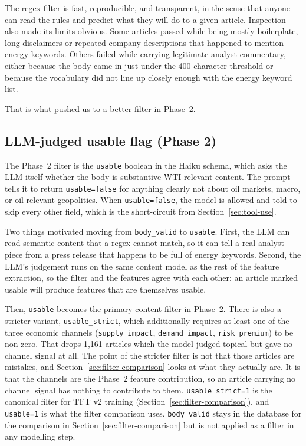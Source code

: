 The regex filter is fast, reproducible, and transparent, in the sense that anyone can read the rules and predict what they will do to a given article. Inspection also made its limits obvious. Some articles passed while being mostly boilerplate, long disclaimers or repeated company descriptions that happened to mention energy keywords. Others failed while carrying legitimate analyst commentary, either because the body came in just under the 400-character threshold or because the vocabulary did not line up closely enough with the energy keyword list.

That is what pushed us to a better filter in Phase~2.

\subsection{LLM-judged usable flag (Phase 2)}\label{sec:usable-filter}

The Phase~2 filter is the \texttt{usable} boolean in the Haiku schema, which asks the LLM itself whether the body is substantive WTI-relevant content. The prompt tells it to return \texttt{usable=false} for anything clearly not about oil markets, macro, or oil-relevant geopolitics. When \texttt{usable=false}, the model is allowed and told to skip every other field, which is the short-circuit from Section~\ref{sec:tool-use}.

Two things motivated moving from \texttt{body\_valid} to \texttt{usable}. First, the LLM can read semantic content that a regex cannot match, so it can tell a real analyst piece from a press release that happens to be full of energy keywords. Second, the LLM's judgement runs on the same content model as the rest of the feature extraction, so the filter and the features agree with each other: an article marked usable will produce features that are themselves usable.

Then, \texttt{usable} becomes the primary content filter in Phase~2. There is also a stricter variant, \texttt{usable\_strict}, which additionally requires at least one of the three economic channels (\texttt{supply\_impact}, \texttt{demand\_impact}, \texttt{risk\_premium}) to be non-zero. That drops 1{,}161 articles which the model judged topical but gave no channel signal at all. The point of the stricter filter is not that those articles are mistakes, and Section~\ref{sec:filter-comparison} looks at what they actually are. It is that the channels are the Phase~2 feature contribution, so an article carrying no channel signal has nothing to contribute to them. \texttt{usable\_strict=1} is the canonical filter for TFT v2 training (Section~\ref{sec:filter-comparison}), and \texttt{usable=1} is what the filter comparison uses. \texttt{body\_valid} stays in the database for the comparison in Section~\ref{sec:filter-comparison} but is not applied as a filter in any modelling step.

